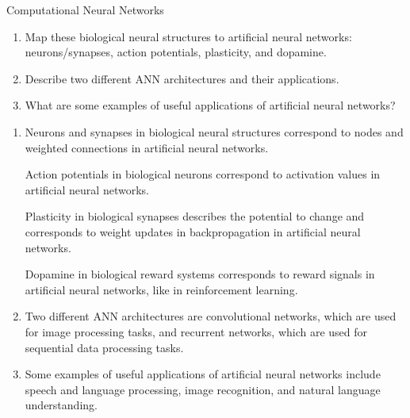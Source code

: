 \documentclass{article}
\begin{document}
\begin{exercise}{Computational Neural Networks}
  \begin{enumerate}
    \item Map these biological neural structures to artificial neural networks: neurons/synapses, action potentials, plasticity, and dopamine.
    \item Describe two different ANN architectures and their applications.
    \item What are some examples of useful applications of artificial neural networks?
  \end{enumerate}

  \begin{solution}
    \begin{enumerate}
      \item Neurons and synapses in biological neural structures correspond to nodes and weighted connections in artificial neural networks.
        \par Action potentials in biological neurons correspond to activation values in artificial neural networks.
        \par Plasticity in biological synapses describes the potential to change and corresponds to weight updates in backpropagation in artificial neural networks.
        \par Dopamine in biological reward systems corresponds to reward signals in artificial neural networks, like in reinforcement learning.
      \item Two different ANN architectures are convolutional networks, which are used for image processing tasks, and recurrent networks, which are used for sequential data processing tasks.
      \item Some examples of useful applications of artificial neural networks include speech and language processing, image recognition, and natural language understanding.
    \end{enumerate}
  \end{solution}
\end{exercise}
\end{document}
